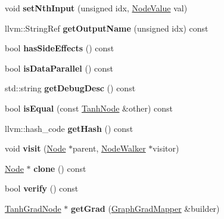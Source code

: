 \begin{DoxyCompactItemize}
void {\bfseries set\+Nth\+Input} (unsigned idx, \hyperlink{structglow_1_1_node_value}{Node\+Value} val)
\item 
\mbox{\label{classglow_1_1_tanh_node_a14052f43ae5c3cf8de9e1f66147ca4af}} 
llvm\+::\+String\+Ref {\bfseries get\+Output\+Name} (unsigned idx) const
\item 
\mbox{\label{classglow_1_1_tanh_node_ab257d898b099aa05c252541f279b1314}} 
bool {\bfseries has\+Side\+Effects} () const
\item 
\mbox{\label{classglow_1_1_tanh_node_a9c65f9842ebc5a37c87cc05cc5802544}} 
bool {\bfseries is\+Data\+Parallel} () const
\item 
\mbox{\label{classglow_1_1_tanh_node_a5293bcbe86207286ed5e1f6c4fe7a4d8}} 
std\+::string {\bfseries get\+Debug\+Desc} () const
\item 
\mbox{\label{classglow_1_1_tanh_node_aa6544dd7879fd31041d680b40e940ff3}} 
bool {\bfseries is\+Equal} (const \hyperlink{classglow_1_1_tanh_node}{Tanh\+Node} \&other) const
\item 
\mbox{\label{classglow_1_1_tanh_node_a9c690bdf005831f4a0f026aedf359e68}} 
llvm\+::hash\+\_\+code {\bfseries get\+Hash} () const
\item 
\mbox{\label{classglow_1_1_tanh_node_a05f26a66b1d2e653896bcf0a5e0e5fc5}} 
void {\bfseries visit} (\hyperlink{classglow_1_1_node}{Node} $\ast$parent, \hyperlink{classglow_1_1_node_walker}{Node\+Walker} $\ast$visitor)
\item 
\mbox{\label{classglow_1_1_tanh_node_a9766d75ebabfd8462323e3376ae5b7c1}} 
\hyperlink{classglow_1_1_node}{Node} $\ast$ {\bfseries clone} () const
\item 
\mbox{\label{classglow_1_1_tanh_node_a346bd6b4b590f2bffee1d2f213aa4278}} 
bool {\bfseries verify} () const
\item 
\mbox{\label{classglow_1_1_tanh_node_ab3cbd503c497733b3f8b442976084265}} 
\hyperlink{classglow_1_1_tanh_grad_node}{Tanh\+Grad\+Node} $\ast$ {\bfseries get\+Grad} (\hyperlink{classglow_1_1_graph_grad_mapper}{Graph\+Grad\+Mapper} \&builder)
\end{DoxyCompactItemize}
